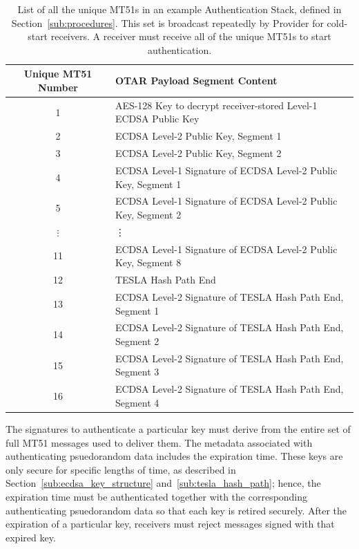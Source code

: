 \documentclass[letterpaper,times]{IONconf/IONconf}
\begin{document}
		\begin{table}%
			\center
			\begin{tabular}{|c|l|} \hline
				Unique MT51 Number & OTAR Payload Segment Content \\ \hline
				1 & AES-128 Key to decrypt receiver-stored Level-1 ECDSA Public Key \\ \hline
				2 & ECDSA Level-2 Public Key, Segment 1 \\ \hline
				3 & ECDSA Level-2 Public Key, Segment 2 \\ \hline
				4 & ECDSA Level-1 Signature of ECDSA Level-2 Public Key, Segment 1 \\ \hline
				5 & ECDSA Level-1 Signature of ECDSA Level-2 Public Key, Segment 2 \\ \hline
				$\vdots$ & \vdots \\ \hline
				11 & ECDSA Level-1 Signature of ECDSA Level-2 Public Key, Segment 8 \\ \hline
				12 & TESLA Hash Path End \\ \hline
				13 & ECDSA Level-2 Signature of TESLA Hash Path End, Segment 1 \\ \hline
				14 & ECDSA Level-2 Signature of TESLA Hash Path End, Segment 2 \\ \hline
				15 & ECDSA Level-2 Signature of TESLA Hash Path End, Segment 3 \\ \hline
				16 & ECDSA Level-2 Signature of TESLA Hash Path End, Segment 4 \\ \hline
			\end{tabular}
			\caption{
				List of all the unique MT51s in an example Authentication Stack, defined in Section~\ref{sub:procedures}.
				This set is broadcast repeatedly by Provider for cold-start receivers.
				A receiver must receive all of the unique MT51s to start authentication.
			}
			\label{tab: mt51-set}
		\end{table}

		The signatures to authenticate a particular key must derive from the entire set of full MT51 messages used to deliver them.
		The metadata associated with authenticating psuedorandom data includes the expiration time.
		These keys are only secure for specific lengths of time, as described in Section~\ref{sub:ecdsa_key_structure} and~\ref{sub:tesla_hash_path}; hence, the expiration time must be authenticated together with the corresponding authenticating psuedorandom data so that each key is retired securely.
		After the expiration of a particular key, receivers must reject messages signed with that expired key.
\end{document}
